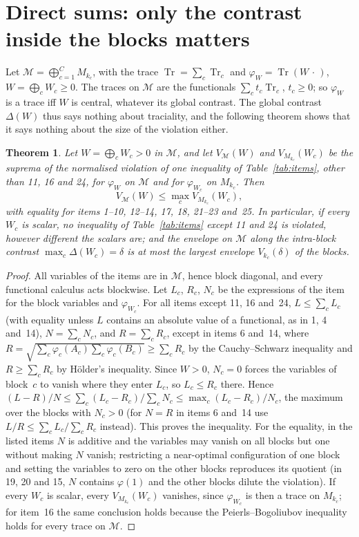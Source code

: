 \documentclass[11pt]{article}
\DeclareMathOperator{\Tr}{Tr}
\newcommand{\M}{\mathcal{M}}
\theoremstyle{plain}
\newtheorem{theorem}{Theorem}[section]
\theoremstyle{definition}
\theoremstyle{remark}
\begin{document}
\section{Direct sums: only the contrast inside the blocks matters}\label{sec:sectors}

Let $\M=\bigoplus_{c=1}^CM_{k_c}$, with the trace $\Tr=\sum_c\Tr_c$ and $\varphi_W=\Tr(W\,\cdot\,)$, $W=\bigoplus_cW_c\ge0$. The
traces on $\M$ are the functionals $\sum_ct_c\Tr_c$, $t_c\ge0$; so $\varphi_W$ is a trace iff $W$ is central, whatever its
global contrast. The global contrast $\Delta(W)$ thus says nothing about traciality, and the following theorem shows that
it says nothing about the size of the violation either.

\begin{theorem}\label{thm:sectors}
Let $W=\bigoplus_cW_c>0$ in $\M$, and let $V_\M(W)$ and $V_{M_{k_c}}(W_c)$ be the suprema of the normalised violation of
one inequality of Table~\ref{tab:items}, other than 11, 16 and 24, for $\varphi_W$ on $\M$ and for $\varphi_{W_c}$ on
$M_{k_c}$. Then
\[
  V_\M(W)\le\max_cV_{M_{k_c}}(W_c),
\]
with equality for items 1--10, 12--14, 17, 18, 21--23 and~25. In particular, if every $W_c$ is scalar, no inequality of
Table~\ref{tab:items} except 11 and 24 is violated, however different the scalars are; and the envelope on $\M$ along
the intra-block contrast $\max_c\Delta(W_c)=\delta$ is at most the largest envelope $V_{k_c}(\delta)$ of the blocks.
\end{theorem}
\begin{proof}
All variables of the items are in $\M$, hence block diagonal, and every functional calculus acts blockwise. Let $L_c$,
$R_c$, $N_c$ be the expressions of the item for the block variables and $\varphi_{W_c}$. For all items except 11, 16 and~24,
$L\le\sum_cL_c$ (with equality unless $L$ contains an absolute value of a functional, as in 1, 4 and~14),
$N=\sum_cN_c$, and $R=\sum_cR_c$, except in items 6 and~14, where $R=\sqrt{\sum_c\varphi_c(A_c)\sum_c\varphi_c(B_c)}\ge
\sum_cR_c$ by the Cauchy--Schwarz inequality and $R\ge\sum_cR_c$ by Hölder's inequality. Since $W>0$, $N_c=0$ forces the
variables of block~$c$ to vanish where they enter $L_c$, so $L_c\le R_c$ there. Hence
$(L-R)/N\le\sum_c(L_c-R_c)/\sum_cN_c\le\max_c(L_c-R_c)/N_c$, the maximum over the blocks with $N_c>0$ (for $N=R$ in items 6
and~14 use $L/R\le\sum_cL_c/\sum_cR_c$ instead). This proves the inequality. For the equality, in the
listed items $N$ is additive and the variables may vanish on all blocks but one without making $N$ vanish; restricting a
near-optimal configuration of one block and setting the variables to zero on the other blocks reproduces its quotient
(in 19, 20 and 15, $N$ contains $\varphi(1)$ and the other blocks dilute the violation). If every $W_c$ is scalar, every
$V_{M_{k_c}}(W_c)$ vanishes, since $\varphi_{W_c}$ is then a trace on $M_{k_c}$; for item~16 the same conclusion holds
because the Peierls--Bogoliubov inequality holds for every trace on $\M$.
\end{proof}
\end{document}
